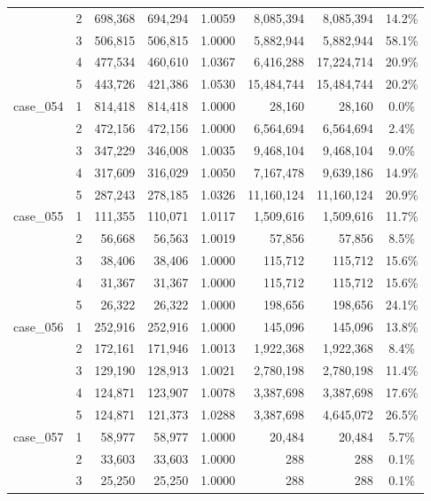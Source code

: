 \begin{footnotesize}
\begin{longtable}{l c rr c rr c}
 & 2 & 698{,}368 & 694{,}294 & 1.0059 & 8{,}085{,}394 & 8{,}085{,}394 & 14.2\% \\
 & 3 & 506{,}815 & 506{,}815 & 1.0000 & 5{,}882{,}944 & 5{,}882{,}944 & 58.1\% \\
 & 4 & 477{,}534 & 460{,}610 & 1.0367 & 6{,}416{,}288 & 17{,}224{,}714 & 20.9\% \\
 & 5 & 443{,}726 & 421{,}386 & 1.0530 & 15{,}484{,}744 & 15{,}484{,}744 & 20.2\% \\
\addlinespace[2pt]
case\_054 & 1 & 814{,}418 & 814{,}418 & 1.0000 & 28{,}160 & 28{,}160 & 0.0\% \\
 & 2 & 472{,}156 & 472{,}156 & 1.0000 & 6{,}564{,}694 & 6{,}564{,}694 & 2.4\% \\
 & 3 & 347{,}229 & 346{,}008 & 1.0035 & 9{,}468{,}104 & 9{,}468{,}104 & 9.0\% \\
 & 4 & 317{,}609 & 316{,}029 & 1.0050 & 7{,}167{,}478 & 9{,}639{,}186 & 14.9\% \\
 & 5 & 287{,}243 & 278{,}185 & 1.0326 & 11{,}160{,}124 & 11{,}160{,}124 & 20.9\% \\
\addlinespace[2pt]
case\_055 & 1 & 111{,}355 & 110{,}071 & 1.0117 & 1{,}509{,}616 & 1{,}509{,}616 & 11.7\% \\
 & 2 & 56{,}668 & 56{,}563 & 1.0019 & 57{,}856 & 57{,}856 & 8.5\% \\
 & 3 & 38{,}406 & 38{,}406 & 1.0000 & 115{,}712 & 115{,}712 & 15.6\% \\
 & 4 & 31{,}367 & 31{,}367 & 1.0000 & 115{,}712 & 115{,}712 & 15.6\% \\
 & 5 & 26{,}322 & 26{,}322 & 1.0000 & 198{,}656 & 198{,}656 & 24.1\% \\
\addlinespace[2pt]
case\_056 & 1 & 252{,}916 & 252{,}916 & 1.0000 & 145{,}096 & 145{,}096 & 13.8\% \\
 & 2 & 172{,}161 & 171{,}946 & 1.0013 & 1{,}922{,}368 & 1{,}922{,}368 & 8.4\% \\
 & 3 & 129{,}190 & 128{,}913 & 1.0021 & 2{,}780{,}198 & 2{,}780{,}198 & 11.4\% \\
 & 4 & 124{,}871 & 123{,}907 & 1.0078 & 3{,}387{,}698 & 3{,}387{,}698 & 17.6\% \\
 & 5 & 124{,}871 & 121{,}373 & 1.0288 & 3{,}387{,}698 & 4{,}645{,}072 & 26.5\% \\
\addlinespace[2pt]
case\_057 & 1 & 58{,}977 & 58{,}977 & 1.0000 & 20{,}484 & 20{,}484 & 5.7\% \\
 & 2 & 33{,}603 & 33{,}603 & 1.0000 & 288 & 288 & 0.1\% \\
 & 3 & 25{,}250 & 25{,}250 & 1.0000 & 288 & 288 & 0.1\% \\

\end{longtable}
\end{footnotesize}
